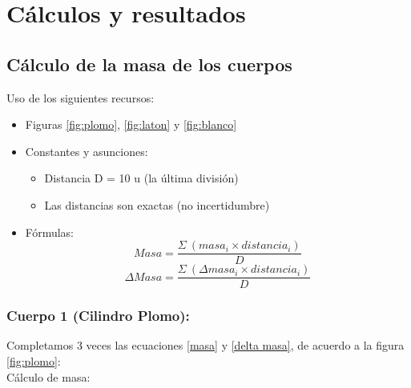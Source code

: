 \documentclass[10pt]{article}
\begin{document}
\section{Cálculos y resultados}

\subsection{Cálculo de la masa de los cuerpos}\vspace{2mm}

Uso de los siguientes recursos:    
\begin{itemize}
    
    \item Figuras \ref{fig:plomo}, \ref{fig:laton} y           \ref{fig:blanco}
    
    \item Constantes y asunciones:
        \begin{itemize}
            \item Distancia D = 10 u (la última división)
            \item Las distancias son exactas (no incertidumbre)
        \end{itemize}
    
    \item Fórmulas:
    \large
    {\begin{equation}
        \label{masa}
        Masa = \frac{\Sigma~(masa_{i} \times distancia_{i})}{D}
    \end{equation}
    \vspace{-0.1cm}
    \begin{equation}
        \label{delta masa}
        \Delta Masa =\frac{\Sigma~(\Delta masa_{i} \times distancia_{i})}{D}
    \end{equation}}
\end{itemize}

\vspace{-0.2cm}
\subsubsection{Cuerpo 1 (Cilindro Plomo):}
\vspace{0,2cm}

Completamos 3 veces las ecuaciones \ref{masa} y \ref{delta masa}, de acuerdo a la figura \ref{fig:plomo}:\\

Cálculo de masa:
\end{document}
